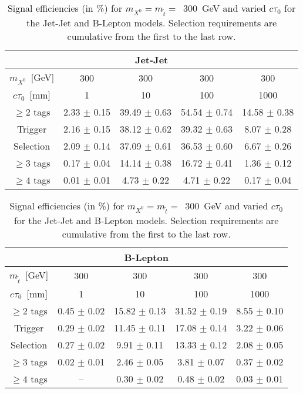 
\begin{table}[tb]
\begin{center}
  \caption{ Signal efficiencies (in \%) for $m_{X^0}=m_{\tilde{t}}=$~300~GeV
    and varied $c\tau_0$ for the Jet-Jet and B-Lepton models. Selection requirements are cumulative from
    the first to the last row. \label{tab:cutflow_300gev}}
\begin{tabular}{ccccc} 
 \multicolumn{5}{c}{\textbf{Jet-Jet}} \\
 \hline 
 $m_{X^0}$~[GeV] & 300 & 300 & 300 & 300 \\ 
 $c\tau_0$~[mm] & 1 & 10 & 100 & 1000 \\ 
 \hline 
 $\geq 2$ tags & 2.33 $\pm$ 0.15 & 39.49 $\pm$ 0.63 & 54.54 $\pm$ 0.74 & 14.58 $\pm$ 0.38 \\ 
 Trigger & 2.16 $\pm$ 0.15 & 38.12 $\pm$ 0.62 & 39.32 $\pm$ 0.63 & 8.07 $\pm$ 0.28 \\ 
Selection& 2.09 $\pm$ 0.14 & 37.09 $\pm$ 0.61 & 36.53 $\pm$ 0.60 & 6.67 $\pm$ 0.26 \\ 
 $\geq 3$ tags &       0.17 $\pm$ 0.04 &       14.14 $\pm$ 0.38 &   16.72 $\pm$ 0.41 &    1.36 $\pm$ 0.12 \\  
 $\geq 4$ tags &       0.01 $\pm$ 0.01 &       4.73 $\pm$ 0.22 &    4.71 $\pm$ 0.22 &     0.17 $\pm$ 0.04 \\
\end{tabular}
\end{center}

\begin{center}
\begin{tabular}{ccccc} 
\multicolumn{5}{c}{\textbf{B-Lepton}} \\
 \hline 
$m_{\tilde{t}}$~[GeV] & 300 & 300 & 300 & 300 \\ 
$c\tau_0$~[mm] & 1 & 10 & 100 & 1000 \\ 
\hline 
$\geq 2$ tags & 0.45 $\pm$ 0.02 & 15.82 $\pm$ 0.13 & 31.52 $\pm$ 0.19 & 8.55 $\pm$ 0.10   \\ 
Trigger       & 0.29 $\pm$ 0.02 & 11.45 $\pm$ 0.11 & 17.08 $\pm$ 0.14 & 3.22 $\pm$ 0.06   \\ 
Selection     & 0.27 $\pm$ 0.02 & 9.91 $\pm$ 0.11  & 13.33 $\pm$ 0.12 & 2.08 $\pm$ 0.05   \\ 
$\geq 3$ tags & 0.02 $\pm$ 0.01 & 2.46 $\pm$ 0.05  & 3.81 $\pm$ 0.07  & 0.37 $\pm$ 0.02   \\ 
$\geq 4$ tags & --              & 0.30 $\pm$ 0.02  & 0.48 $\pm$ 0.02  & 0.03 $\pm$ 0.01 \\ 
\end{tabular}
\end{center}
\end{table}

